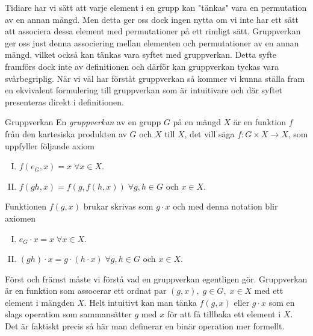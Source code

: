 \documentclass{article}
\theoremstyle{definition}
\begin{document}
Tidiare har vi sätt att varje element i en grupp kan "tänkas" vara en permutation 
av en annan mängd. Men detta ger oss dock ingen nytta om vi inte har ett sätt 
att associera dessa element med permutationer på ett rimligt sätt.
Gruppverkan ger oss just denna associering mellan elementen och permutationer 
av en annan mängd, vilket också kan tänkas vara syftet med gruppverkan. 
Detta syfte framförs dock inte av definitionen och därför kan gruppverkan
tyckas vara svårbegriplig. 
När vi väl har förståt gruppverkan så kommer vi kunna ställa fram en ekvivalent formulering
till gruppverkan som är intuitivare och där syftet presenteras direkt i definitionen.


\begin{mydef}{Gruppverkan}{}
  En \textit{gruppverkan} av en grupp $G$ på en mängd $X$ är en funktion $f$ från den 
  kartesiska produkten av $G$ och $X$ till $X$, det vill säga $f: G \times X \rightarrow X$,
  som uppfyller följande axiom
  \begin{enumerate}[I)]
    \item $f(e_G, x) = x \; \forall x \in X$.
    \item $f(gh, x) = f(g, f(h,x)) \; \forall g, h \in G$ och $x \in X$.
  \end{enumerate}
  Funktionen $f(g, x)$ brukar skrivas som $g \cdot x$ och med denna notation 
  blir axiomen
  \begin{enumerate}[I)]
    \item $e_G \cdot x = x \; \forall x \in X$.
    \item $(gh) \cdot x = g \cdot (h \cdot x) \; \forall g, h \in G$ och $x \in X$.
  \end{enumerate}
\end{mydef}
Först och främst måste vi förstå vad en gruppverkan egentligen gör. 
Gruppverkan är en funktion som assocerar ett ordnat par $(g, x), \; g \in G, \; x \in X$
med ett element i mängden $X$. Helt intuitivt kan man tänka $f(g, x)$ eller 
$g \cdot x$ som en slags operation som sammansätter $g$ med $x$ för att få tillbaka ett 
element i $X$. Det är faktiskt precis så här man definerar en binär operation mer formellt. 
\end{document}
